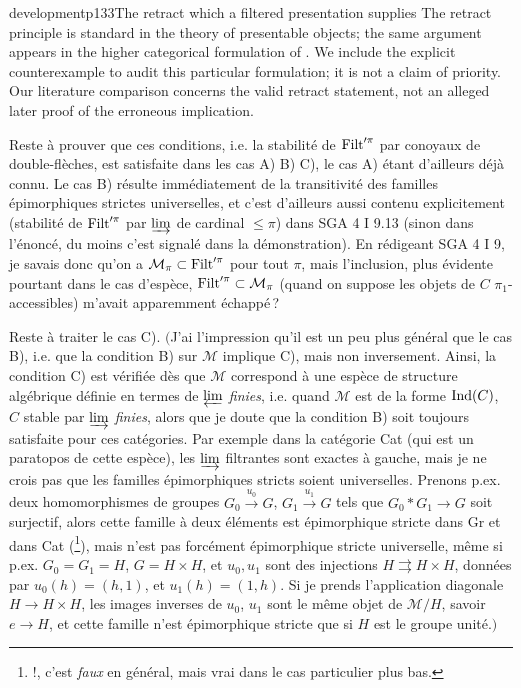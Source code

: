 \begin{dcomment}{development}{p133}{The retract which a filtered presentation supplies}
The retract principle is standard in the theory of presentable objects; the same argument appears in the higher categorical formulation of \citet[Lemma~5.4.2.4]{Lurie2009HTT}. We include the explicit counterexample to audit this particular formulation; it is not a claim of priority. Our literature comparison concerns the valid retract statement, not an alleged later proof of the erroneous implication.
\end{dcomment}


Reste à prouver que ces conditions, i.e. la stabilité de $\operatorname{Filt}'^{\pi}$ par conoyaux de double-flèches, est satisfaite dans les cas A) B) C), le cas A) étant d'ailleurs déjà connu. Le cas B) résulte immédiatement de la transitivité des familles épimorphiques strictes universelles, et c'est d'ailleurs aussi contenu explicitement (stabilité de $\operatorname{Filt}'^{\pi}$ par $\varinjlim$ de cardinal $\leqslant \pi$) dans SGA 4 I 9.13 (sinon dans l'énoncé, du moins c'est signalé dans la démonstration). En rédigeant SGA 4 I 9, je savais donc qu'on a $\mathcal{M}_{\pi} \subset \operatorname{Filt}'^{\pi}$ pour tout $\pi$, mais l'inclusion, plus évidente pourtant dans le cas d'espèce, $\operatorname{Filt}'^{\pi} \subset \mathcal{M}_{\pi}$ (quand on suppose les objets de $C$ $\pi_1$-accessibles) m'avait apparemment échappé\,?

Reste à traiter le cas C). $\Big($J'ai l'impression qu'il est un peu plus général que le cas B), i.e. que la condition B) sur $\mathcal{M}$ implique C), mais non inversement. Ainsi, la condition C) est vérifiée dès que $\mathcal{M}$ correspond à une espèce de structure algébrique définie en
termes de $\varprojlim$ \textit{finies}, i.e. quand $\mathcal{M}$ est de la forme $\operatorname{Ind}(C)$, $C$ stable par $\varinjlim$ \textit{finies}, alors que je doute que la condition B) soit toujours satisfaite pour ces catégories. Par exemple dans la catégorie Cat (qui est un paratopos de cette espèce), les $\varinjlim$ filtrantes sont exactes à gauche, mais je ne crois pas que les familles épimorphiques stricts soient universelles. %
Prenons p.ex. deux homomorphismes de groupes $G_0 \xrightarrow{u_0} G$, $G_1 \xrightarrow{u_1} G$ tels que $G_0 * G_1 \longrightarrow G$ soit surjectif, alors cette famille à deux éléments est épimorphique stricte dans Gr et dans Cat (\footnote{!, c'est \textit{faux} en général, mais vrai dans le cas particulier plus bas.}), mais n'est pas forcément épimorphique stricte universelle, même si p.ex. $G_0 = G_1 = H$, $G = H \times H$, et $u_0, u_1$ sont des injections $H \rightrightarrows H \times H$, données par $u_0(h) = (h,1)$, et $u_1(h) = (1,h)$. Si je prends l'application diagonale $H \longrightarrow H \times H$, les images inverses de $u_0$, $u_1$ sont le même objet de $\mathcal{M}/H$, savoir $e \longrightarrow H$, et cette famille n'est épimorphique stricte que si $H$ est le groupe unité.$\Big)$

